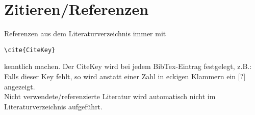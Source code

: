\chapter{Zitieren/Referenzen}

Referenzen aus dem Literaturverzeichnis immer mit \begin{verbatim}\cite{CiteKey}\end{verbatim} kenntlich machen.
Der CiteKey wird bei jedem BibTex-Eintrag festgelegt, z.B.: \cite{Welsh:2001:SAW:502034.502057}\\
Falls dieser Key fehlt, so wird anstatt einer Zahl in eckigen Klammern ein [?] angezeigt.\\
Nicht verwendete/referenzierte Literatur wird automatisch nicht im Literaturverzeichnis aufgeführt.
